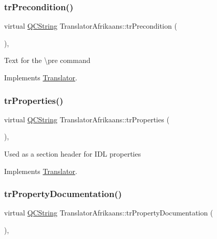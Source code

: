 \subsubsection{\texorpdfstring{trPrecondition()}{trPrecondition()}}
{\footnotesize\ttfamily virtual \mbox{\hyperlink{class_q_c_string}{Q\+C\+String}} Translator\+Afrikaans\+::tr\+Precondition (\begin{DoxyParamCaption}{ }\end{DoxyParamCaption})\hspace{0.3cm}{\ttfamily [inline]}, {\ttfamily [virtual]}}

Text for the \textbackslash{}pre command 

Implements \mbox{\hyperlink{class_translator}{Translator}}.

\mbox{\label{class_translator_afrikaans_a1b284e3ba3e447e827de7c95f684bd8e}} 
\subsubsection{\texorpdfstring{trProperties()}{trProperties()}}
{\footnotesize\ttfamily virtual \mbox{\hyperlink{class_q_c_string}{Q\+C\+String}} Translator\+Afrikaans\+::tr\+Properties (\begin{DoxyParamCaption}{ }\end{DoxyParamCaption})\hspace{0.3cm}{\ttfamily [inline]}, {\ttfamily [virtual]}}

Used as a section header for I\+DL properties 

Implements \mbox{\hyperlink{class_translator}{Translator}}.

\mbox{\label{class_translator_afrikaans_ad82f4defbb1f515b08627ffef64707de}} 
\subsubsection{\texorpdfstring{trPropertyDocumentation()}{trPropertyDocumentation()}}
{\footnotesize\ttfamily virtual \mbox{\hyperlink{class_q_c_string}{Q\+C\+String}} Translator\+Afrikaans\+::tr\+Property\+Documentation (\begin{DoxyParamCaption}{ }\end{DoxyParamCaption})\hspace{0.3cm}{\ttfamily [inline]}, {\ttfamily [virtual]}}

